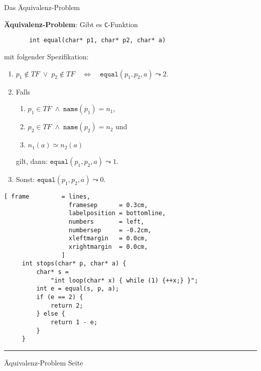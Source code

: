 \documentclass{slides}
\newcounter{mypage}
\begin{document}
\begin{slide}{}
 \begin{center}
Das Äquivalenz-Problem
\end{center}

\footnotesize
\textbf{Äquivalenz-Problem}:
Gibt es \texttt{C}-Funktion 
\begin{verbatim}
       int equal(char* p1, char* p2, char* a)
\end{verbatim}
mit folgender  Spezifikation:
\begin{enumerate}
\item $p_1 \not\in T\!F \;\vee\; p_2 \not\in T\!F \quad\Leftrightarrow\quad \mathtt{equal}(p_1, p_2, a) \leadsto 2$.
\item Falls 
  \begin{enumerate}
  \item $p_1 \in T\!F \;\wedge\; \mathtt{name}(p_1) = n_1$,
  \item $p_2 \in T\!F \;\wedge\; \mathtt{name}(p_2) = n_2$ \quad und
  \item $n_1(a) \simeq n_2(a)$
  \end{enumerate}
    gilt, dann:   $\mathtt{equal}(p_1, p_2, a) \leadsto 1$.
\item Sonst: $\mathtt{equal}(p_1, p_2, a) \leadsto 0$.
\end{enumerate}



\begin{Verbatim}[ frame         = lines, 
                  framesep      = 0.3cm, 
                  labelposition = bottomline,
                  numbers       = left,
                  numbersep     = -0.2cm,
                  xleftmargin   = 0.0cm,
                  xrightmargin  = 0.0cm,
                ]
     int stops(char* p, char* a) {
         char* s = 
             "int loop(char* x) { while (1) {++x;} }";
         int e = equal(s, p, a);
         if (e == 2) {
             return 2;
         } else {
             return 1 - e;
         }
     }
\end{Verbatim}


\vspace*{\fill}
\tiny \addtocounter{mypage}{1}
\rule{17cm}{1mm}
Äquivalenz-Problem  \hspace*{\fill} Seite 
\end{slide}

\end{document}
